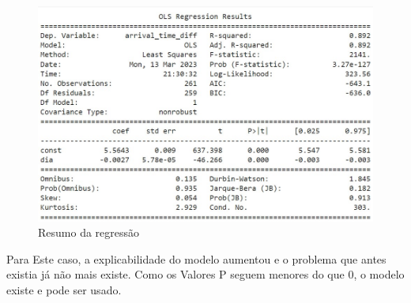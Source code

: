 \begin{figure}[H]
    \includegraphics[scale = 0.85]{analise-de-dados/regressao/EXPO_OLS_Summary.jpg}
    \caption{Resumo da regressão}
    \label{fig: sum_Expo_OLS}
\end{figure}

Para Este caso, a explicabilidade do modelo aumentou e o problema que antes existia já não mais existe. Como os Valores P seguem menores do que 0, o modelo existe e pode ser usado.
